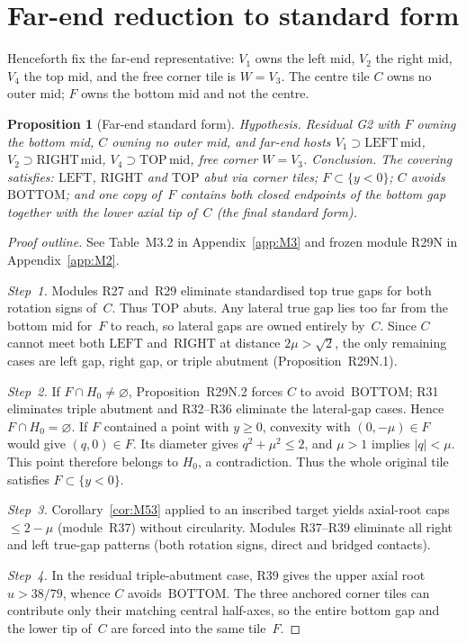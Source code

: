 \documentclass[11pt,reqno]{amsart}
\newtheorem{proposition}[theorem]{Proposition}
\theoremstyle{definition}
\newcommand{\BOTTOM}{\mathrm{BOTTOM}}
\newcommand{\RIGHT}{\mathrm{RIGHT}}
\newcommand{\TOP}{\mathrm{TOP}}
\newcommand{\LEFT}{\mathrm{LEFT}}
\begin{document}
\section{Far-end reduction to standard form}\label{sec:far}

Henceforth fix the far-end representative: $V_1$ owns the left mid, $V_2$ the
right mid, $V_4$ the top mid, and the free corner tile is $W=V_3$.  The centre
tile $C$ owns no outer mid; $F$ owns the bottom mid and not the centre.

\begin{proposition}[Far-end standard form]\label{prop:M71}
\emph{Hypothesis.} Residual G2 with $F$ owning the bottom mid, $C$ owning no
outer mid, and far-end hosts $V_1\supset\mathrm{LEFT\,mid}$,
$V_2\supset\mathrm{RIGHT\,mid}$, $V_4\supset\mathrm{TOP\,mid}$, free corner
$W=V_3$.
\emph{Conclusion.} The covering satisfies: $\LEFT$, $\RIGHT$ and $\TOP$ abut
via corner tiles; $F\subset\{y<0\}$; $C$ avoids~$\BOTTOM$; and one copy of~$F$
contains both closed endpoints of the bottom gap together with the lower axial
tip of~$C$ (the \emph{final standard form}).
\end{proposition}

\begin{proof}[Proof outline]
See Table~M3.2 in Appendix~\ref{app:M3} and frozen module R29N in
Appendix~\ref{app:M2}.

\emph{Step~1.} Modules R27 and~R29 eliminate standardised top true gaps for
both rotation signs of~$C$.  Thus $\TOP$ abuts.  Any lateral true gap lies too
far from the bottom mid for~$F$ to reach, so lateral gaps are owned entirely
by~$C$.  Since $C$ cannot meet both $\LEFT$ and~$\RIGHT$ at distance
$2\mu>\sqrt2$, the only remaining cases are left gap, right gap, or triple
abutment (Proposition~R29N.1).

\emph{Step~2.} If $F\cap H_0\neq\varnothing$, Proposition~R29N.2 forces $C$ to
avoid~$\BOTTOM$; R31 eliminates triple abutment and R32--R36 eliminate the
lateral-gap cases.  Hence $F\cap H_0=\varnothing$.  If $F$ contained a point with $y\ge0$, convexity with
$(0,-\mu)\in F$ would give $(q,0)\in F$. Its diameter gives
$q^2+\mu^2\le2$, and $\mu>1$ implies $|q|<\mu$. This point therefore
belongs to $H_0$, a contradiction. Thus the whole original tile satisfies
$F\subset\{y<0\}$.

\emph{Step~3.} Corollary~\ref{cor:M53} applied to an inscribed target yields
axial-root caps $\le 2-\mu$ (module~R37) without circularity.  Modules
R37--R39 eliminate all right and left true-gap patterns (both rotation signs,
direct and bridged contacts).

\emph{Step~4.} In the residual triple-abutment case, R39 gives the upper axial
root $u>38/79$, whence $C$ avoids~$\BOTTOM$.  The three anchored corner tiles
can contribute only their matching central half-axes, so the entire bottom gap
and the lower tip of~$C$ are forced into the same tile~$F$.
\end{proof}
\end{document}
